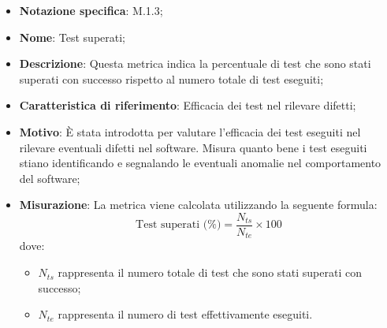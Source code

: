 \begin{itemize}
    \item \textbf{Notazione specifica}: M.1.3;
    \item \textbf{Nome}: Test superati;
    \item \textbf{Descrizione}: Questa metrica indica la percentuale di test che sono stati superati con successo rispetto al numero totale di test eseguiti;
    \item \textbf{Caratteristica di riferimento}: Efficacia dei test nel rilevare difetti;
    \item \textbf{Motivo}: È stata introdotta per valutare l'efficacia dei test eseguiti nel rilevare eventuali difetti nel software. Misura quanto bene i test eseguiti stiano identificando e segnalando le eventuali anomalie nel comportamento del software;
    \item \textbf{Misurazione}: La metrica viene calcolata utilizzando la seguente formula:
    \[
    \text{Test superati (\%)} = \frac{N_{ts}}{N_{te}} \times 100
    \]
    dove:
    \begin{itemize}
        \item $N_{ts}$ rappresenta il numero totale di test che sono stati superati con successo;
        \item $N_{te}$ rappresenta il numero di test effettivamente eseguiti.
    \end{itemize}
    
\end{itemize}
